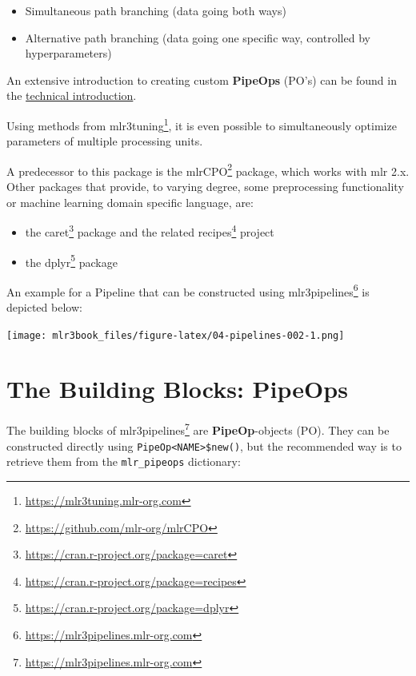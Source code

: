 \documentclass[12pt,]{scrbook}
\providecommand{\tightlist}{%
  \setlength{\itemsep}{0pt}\setlength{\parskip}{0pt}}
\renewcommand{\href}[2]{#2\footnote{\url{#1}}}
\begin{document}
\begin{itemize}
\tightlist
\item
  Simultaneous path branching (data going both ways)
\item
  Alternative path branching (data going one specific way, controlled by hyperparameters)
\end{itemize}

An extensive introduction to creating custom \textbf{PipeOps} (PO's) can be found in the \protect\hyperlink{extending-mlr3pipelines}{technical introduction}.

Using methods from \href{https://mlr3tuning.mlr-org.com}{mlr3tuning}, it is even possible to simultaneously optimize parameters of multiple processing units.

A predecessor to this package is the \href{https://github.com/mlr-org/mlrCPO}{mlrCPO} package, which works with mlr 2.x.
Other packages that provide, to varying degree, some preprocessing functionality or machine learning domain specific language, are:

\begin{itemize}
\tightlist
\item
  the \href{https://cran.r-project.org/package=caret}{caret} package and the related \href{https://cran.r-project.org/package=recipes}{recipes} project
\item
  the \href{https://cran.r-project.org/package=dplyr}{dplyr} package
\end{itemize}

An example for a Pipeline that can be constructed using \href{https://mlr3pipelines.mlr-org.com}{mlr3pipelines} is depicted below:

\texttt{[image: mlr3book\_files/figure-latex/04-pipelines-002-1.png]}

\hypertarget{the-building-blocks-pipeops}{%
\section{The Building Blocks: PipeOps}\label{the-building-blocks-pipeops}}

The building blocks of \href{https://mlr3pipelines.mlr-org.com}{mlr3pipelines} are \textbf{PipeOp}-objects (PO).
They can be constructed directly using \texttt{PipeOp\textless{}NAME\textgreater{}\$new()}, but the recommended way is to retrieve them from the \texttt{mlr\_pipeops} dictionary:
\end{document}
